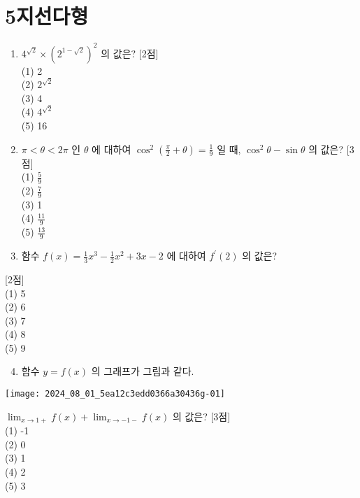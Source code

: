 \documentclass[10pt]{article}
\begin{document}
\section*{5지선다형}
\begin{enumerate}
  \item $4^{\sqrt{2}} \times\left(2^{1-\sqrt{2}}\right)^{2}$ 의 값은? [2점]\\
(1) 2\\
(2) $2^{\sqrt{2}}$\\
(3) 4\\
(4) $4^{\sqrt{2}}$\\
(5) 16

  \item $\pi<\theta<2 \pi$ 인 $\theta$ 에 대하여 $\cos ^{2}\left(\frac{\pi}{2}+\theta\right)=\frac{1}{9}$ 일 때, $\cos ^{2} \theta-\sin \theta$ 의 값은? [3점]\\
(1) $\frac{5}{9}$\\
(2) $\frac{7}{9}$\\
(3) 1\\
(4) $\frac{11}{9}$\\
(5) $\frac{13}{9}$

  \item 함수 $f(x)=\frac{1}{3} x^{3}-\frac{1}{2} x^{2}+3 x-2$ 에 대하여 $f^{\prime}(2)$ 의 값은?

\end{enumerate}

[2점]\\
(1) 5\\
(2) 6\\
(3) 7\\
(4) 8\\
(5) 9

\begin{enumerate}
  \setcounter{enumi}{3}
  \item 함수 $y=f(x)$ 의 그래프가 그림과 같다.
\end{enumerate}

\begin{center}
\texttt{[image: 2024\_08\_01\_5ea12c3edd0366a30436g-01]}
\end{center}

$\lim _{x \rightarrow 1+} f(x)+\lim _{x \rightarrow-1-} f(x)$ 의 값은? [3점]\\
(1) -1\\
(2) 0\\
(3) 1\\
(4) 2\\
(5) 3
\end{document}
